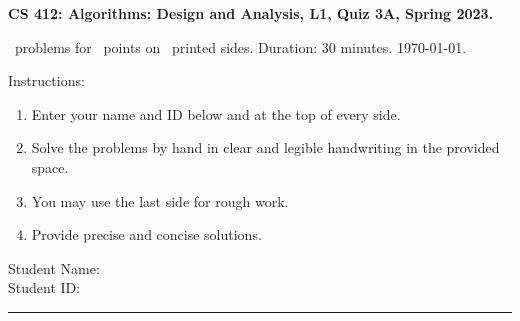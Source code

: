\documentclass[addpoints,a4paper]{exam}
\begin{document}
\begin{flushleft}
  { \large \textsf{\textbf{CS 412: Algorithms: Design and Analysis, L1, Quiz 3A, Spring 2023.}}}\vspace{.5em}
  
  \numquestions\ problems for \numpoints\ points on \numpages\ printed sides. Duration: 30 minutes. \today.
\end{flushleft}

Instructions:
\begin{enumerate}
\item Enter your name and ID below and at the top of every side.
\item Solve the problems by hand in clear and legible handwriting in the provided space.
\item You may use the last side for rough work.
\item Provide precise and concise solutions.
\end{enumerate}

\noindent Student Name: \hrulefill \\[5pt]
\noindent Student ID: \hrulefill \\
\rule{\textwidth}{1pt}
\end{document}
